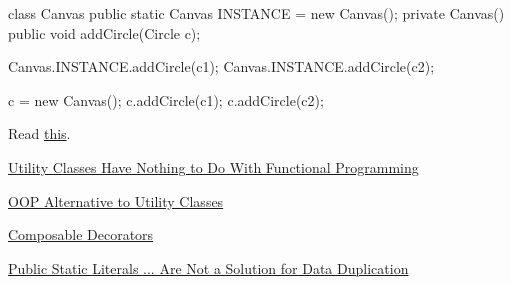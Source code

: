 \documentclass{article}
\begin{document}
\begin{pptWide}{2}
{\small\begin{ffcode}
class Canvas {
  public static Canvas INSTANCE =
    new Canvas();
  private Canvas() {}
  public void addCircle(Circle c);
}

Canvas.INSTANCE.addCircle(c1);
Canvas.INSTANCE.addCircle(c2);
\end{ffcode}
}
\par\columnbreak\par
{\small\begin{ffcode}
c = new Canvas();
c.addCircle(c1);
c.addCircle(c2);
\end{ffcode}
}
\end{pptWide}
\par
Read \href{https://www.yegor256.com/2016/06/27/singletons-must-die.html}{this}.
\plush{}



\href{https://www.yegor256.com/2015/02/20/utility-classes-vs-functional-programming.html}{Utility Classes Have Nothing to Do With Functional Programming}

\href{https://www.yegor256.com/2014/05/05/oop-alternative-to-utility-classes.html}{OOP Alternative to Utility Classes}

\href{https://www.yegor256.com/2015/02/26/composable-decorators.html}{Composable Decorators}

\href{https://www.yegor256.com/2015/07/06/public-static-literals.html}{Public Static Literals ... Are Not a Solution for Data Duplication}
\end{document}
